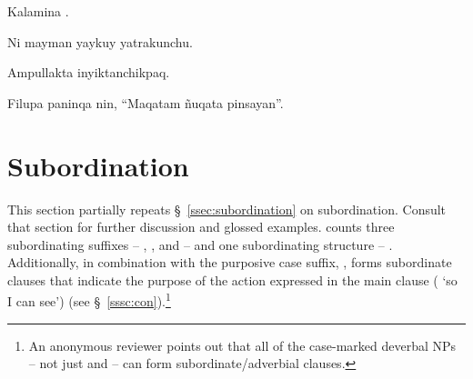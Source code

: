 %
{Kalamina .}%
{}%
{}{}%

%
{Ni mayman yaykuy yatrakunchu.}%
{}%
{}{}%

%
{Ampullakta inyiktanchikpaq.}%
{}%
{}{}%

%
{Filupa paninqa nin, ``Maqatam \~nuqata pinsayan''.}%
{}%
{}{}%

\section{Subordination}
This section partially repeats \S~\ref{ssec:subordination} on subordination. Consult that section for further discussion and glossed examples. \SYQ{} counts three subordinating suffixes -- , , and  -- and one subordinating structure -- . Additionally, in combination with the purposive case suffix, ,  forms subordinate clauses that indicate the purpose of the action expressed in the main clause ( `so I can see') (see \S~\ref{sssc:con}).\footnote{An anonymous reviewer points out that all of the case-marked deverbal NPs -- not just  and  -- can form subordinate/adverbial clauses.}

